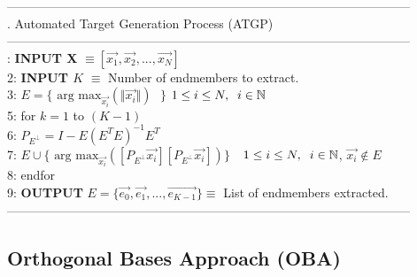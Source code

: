 \documentclass[11pt, oneside]{Thesis} %
\begin{document}
\noindent--------------------------------------------------------------------------------------------------\\
.\hspace{1.8cm} Automated Target Generation Process (ATGP)\\
\noindent--------------------------------------------------------------------------------------------------\\
: \hspace{0.3cm}\textbf{INPUT X} $\equiv \left[ \vec{x_{1}}, \vec{x_{2}}, ..., 
\vec{x_{N}} \right]$\\
2: \hspace{0.3cm}\textbf{INPUT $K$} $\equiv$ Number of endmembers to extract.\\
3: \hspace{0.3cm}$E = \lbrace \text{ arg max}_{\vec{x_{i}}} \left( \Vert \vec{x_{i}} 
\Vert \right) \text{ } \rbrace$ \hspace{2.75cm}$1 \leq i \leq N, \hspace{2mm} i \in 
\mathbb{N}$\\
5: \hspace{0.3cm}for $k=1$ to $(K-1)$\\
6: \hspace{0.8cm}$P_{E^\perp} = I - E(E^{T}E)^{-1}E^{T} $\\
7: \hspace{0.8cm}$E\cup \lbrace \text{ arg max}_{\vec{x_{i}}} \left(  
\left[ P_{E^\perp}\vec{x_{i}}  \right] \left[ P_{E^\perp}\vec{x_{i}}  \right] \right) 
\rbrace \text{ }$ \hspace{5mm}$1 \leq i \leq N, \hspace{2mm} i \in \mathbb{N}$, 
$\vec{x_{i}} \not \in E$\\
8: \hspace{0.3cm}endfor\\
9: \hspace{0.3cm}\textbf{OUTPUT} $E = \lbrace \vec{e_{0}}, \vec{e_{1}}, ..., \vec{e_{K-1}} 
\rbrace \equiv$ List of endmembers extracted. \\
\noindent--------------------------------------------------------------------------------------------------\\

\subsection{Orthogonal Bases Approach (OBA)}

\label{sectionDescOBA}
\end{document}
